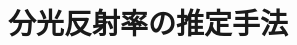 \documentclass[../main]{subfiles}
\begin{document}
\graphicspath{{../figures/chap3/}}

\section{分光反射率の推定手法}
\label{sec:pmethod_method}
\end{document}
